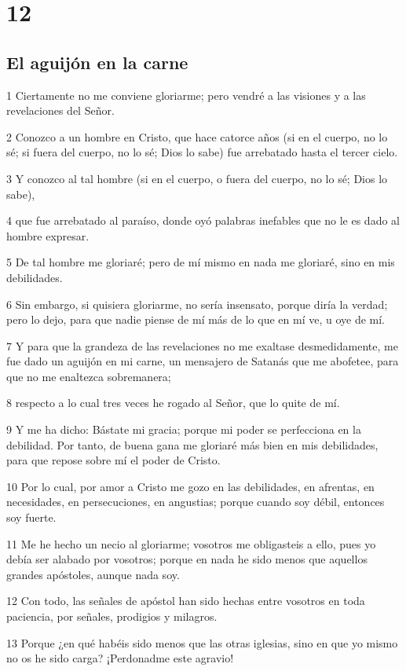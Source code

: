 \chapter{12}

\section*{El aguijón en la carne}

\par 1 Ciertamente no me conviene gloriarme; pero vendré a las visiones y a las revelaciones del Señor.
\par 2 Conozco a un hombre en Cristo, que hace catorce años (si en el cuerpo, no lo sé; si fuera del cuerpo, no lo sé; Dios lo sabe) fue arrebatado hasta el tercer cielo.
\par 3 Y conozco al tal hombre (si en el cuerpo, o fuera del cuerpo, no lo sé; Dios lo sabe),
\par 4 que fue arrebatado al paraíso, donde oyó palabras inefables que no le es dado al hombre expresar.
\par 5 De tal hombre me gloriaré; pero de mí mismo en nada me gloriaré, sino en mis debilidades.
\par 6 Sin embargo, si quisiera gloriarme, no sería insensato, porque diría la verdad; pero lo dejo, para que nadie piense de mí más de lo que en mí ve, u oye de mí.
\par 7 Y para que la grandeza de las revelaciones no me exaltase desmedidamente, me fue dado un aguijón en mi carne, un mensajero de Satanás que me abofetee, para que no me enaltezca sobremanera;
\par 8 respecto a lo cual tres veces he rogado al Señor, que lo quite de mí.
\par 9 Y me ha dicho: Bástate mi gracia; porque mi poder se perfecciona en la debilidad. Por tanto, de buena gana me gloriaré más bien en mis debilidades, para que repose sobre mí el poder de Cristo.
\par 10 Por lo cual, por amor a Cristo me gozo en las debilidades, en afrentas, en necesidades, en persecuciones, en angustias; porque cuando soy débil, entonces soy fuerte.
\par 11 Me he hecho un necio al gloriarme; vosotros me obligasteis a ello, pues yo debía ser alabado por vosotros; porque en nada he sido menos que aquellos grandes apóstoles, aunque nada soy.
\par 12 Con todo, las señales de apóstol han sido hechas entre vosotros en toda paciencia, por señales, prodigios y milagros.
\par 13 Porque ¿en qué habéis sido menos que las otras iglesias, sino en que yo mismo no os he sido carga? ¡Perdonadme este agravio!

